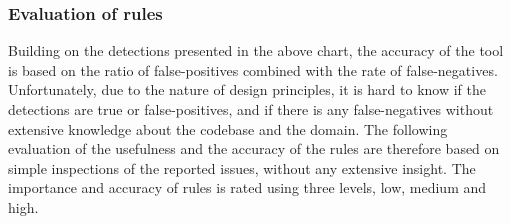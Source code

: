 \documentclass{report}
\begin{document}
\subsubsection{Evaluation of rules}
Building on the detections presented in the above chart, the accuracy of the tool is based on the ratio of false-positives combined with the rate of false-negatives. Unfortunately, due to the nature of design principles, it is hard to know if the detections are true or false-positives, and if there is any false-negatives without extensive knowledge about the codebase and the domain. The following evaluation of the usefulness and the accuracy of the rules are therefore based on simple inspections of the reported issues, without any extensive insight. The importance and accuracy of rules is rated using three levels, low, medium and high.
\end{document}
